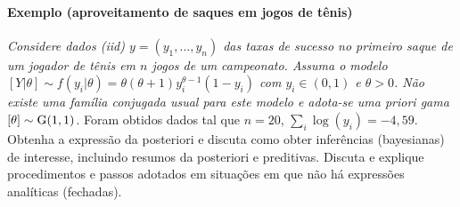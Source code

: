 \documentclass[11pt,a4]{article}\usepackage[]{graphicx}\usepackage[]{xcolor}
\begin{document}
\begin{enumerate}
\paragraph{\bf Exemplo (aproveitamento de saques em jogos de tênis)}
{\it Considere dados 
(iid) $y = (y_1, \ldots , y_n)$ das taxas de sucesso
no primeiro saque de um jogador de tênis em $n$ jogos de um campeonato.
Assuma o modelo $[Y|\theta] \sim f(y_i|\theta) = \theta (\theta+1) y_i^{\theta-1} (1-y_i)$
com $y_i \in (0,1)$ e $\theta > 0$. Não existe uma família conjugada usual para este modelo
e adota-se uma priori gama $[\theta] \sim {\rm G}(1,1)$.}
Foram obtidos dados tal que $n=20$, $\sum_i \log (y_i) = -4,59$. 
Obtenha a expressão da posteriori e discuta como obter inferências 
(bayesianas) de interesse, incluindo resumos da posteriori 
e preditivas.
Discuta e explique procedimentos e passos adotados  
em situações em que não há expressões analíticas (fechadas).


\end{enumerate}
\end{document}
